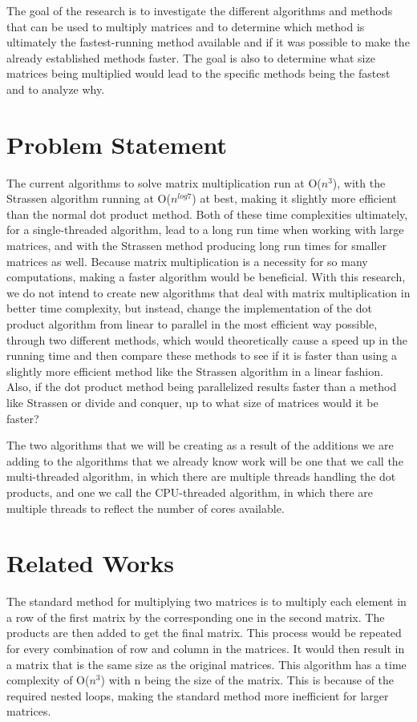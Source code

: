 \documentclass[conference]{IEEEtran}
\begin{document}
     The goal of the research is to investigate the different algorithms and methods that can be used to multiply matrices and to determine which method is ultimately the fastest-running method available and if it was possible to make the already established methods faster. The goal is also to determine what size matrices being multiplied would lead to the specific methods being the fastest and to analyze why.

\section{Problem Statement}

    The current algorithms to solve matrix multiplication run at O(\(n^3\)), with the Strassen algorithm running at O(\(n^{log7}\)) at best, making it slightly more efficient than the normal dot product method. Both of these time complexities ultimately, for a single-threaded algorithm, lead to a long run time when working with large matrices, and with the Strassen method producing long run times for smaller matrices as well. Because matrix multiplication is a necessity for so many computations, making a faster algorithm would be beneficial. With this research, we do not intend to create new algorithms that deal with matrix multiplication in better time complexity, but instead, change the implementation of the dot product algorithm from linear to parallel in the most efficient way possible, through two different methods, which would theoretically cause a speed up in the running time and then compare these methods to see if it is faster than using a slightly more efficient method like the Strassen algorithm in a linear fashion. Also, if the dot product method being parallelized results faster than a method like Strassen or divide and conquer, up to what size of matrices would it be faster?

    The two algorithms that we will be creating as a result of the additions we are adding to the algorithms that we already know work will be one that we call the multi-threaded algorithm, in which there are multiple threads handling the dot products, and one we call the CPU-threaded algorithm, in which there are multiple threads to reflect the number of cores available.

\section{Related Works}
    The standard method for multiplying two matrices is to multiply each element in a row of the first matrix by the corresponding one in the second matrix. The products are then added to get the final matrix. This process would be repeated for every combination of row and column in the matrices. It would then result in a matrix that is the same size as the original matrices. This algorithm has a time complexity of O(\(n^3\)) with n being the size of the matrix. This is because of the required nested loops, making the standard method more inefficient for larger matrices. 
    
\end{document}
